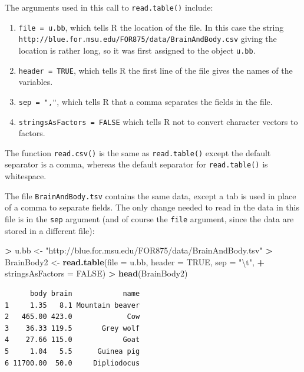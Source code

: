 \documentclass[]{krantz}
\makeatletter
\newenvironment{Shaded}{\begin{snugshade}}{\end{snugshade}}
\newcommand{\CharTok}[1]{\textcolor[rgb]{0.5,0.5,0.5}{#1}}
\newcommand{\DataTypeTok}[1]{\textcolor[rgb]{0.27,0.27,0.27}{#1}}
\newcommand{\KeywordTok}[1]{\textcolor[rgb]{0.27,0.27,0.27}{\textbf{#1}}}
\newcommand{\NormalTok}[1]{#1}
\newcommand{\OperatorTok}[1]{\textcolor[rgb]{0.43,0.43,0.43}{\textbf{#1}}}
\newcommand{\OtherTok}[1]{\textcolor[rgb]{0.37,0.37,0.37}{#1}}
\newcommand{\StringTok}[1]{\textcolor[rgb]{0.5,0.5,0.5}{#1}}
\providecommand{\tightlist}{%
  \setlength{\itemsep}{0pt}\setlength{\parskip}{0pt}}
\newenvironment{kframe}{%
\medskip{}
\setlength{\fboxsep}{.8em}
 \def\at@end@of@kframe{}%
 \ifinner\ifhmode%
  \def\at@end@of@kframe{\end{minipage}}%
  \begin{minipage}{\columnwidth}%
 \fi\fi%
 \def\FrameCommand##1{\hskip\@totalleftmargin \hskip-\fboxsep
 \colorbox{shadecolor}{##1}\hskip-\fboxsep
     \hskip-\linewidth \hskip-\@totalleftmargin \hskip\columnwidth}%
 \MakeFramed {\advance\hsize-\width
   \@totalleftmargin\z@ \linewidth\hsize
   \@setminipage}}%
 {\par\unskip\endMakeFramed%
 \at@end@of@kframe}
\renewenvironment{Shaded}{\begin{kframe}}{\end{kframe}}
\makeatother
\begin{document}
The arguments used in this call to \texttt{read.table()} include:

\begin{enumerate}
\def\labelenumi{\arabic{enumi}.}
\tightlist
\item
  \texttt{file\ =\ u.bb}, which tells R the location of the file. In this case the string \texttt{http://blue.for.msu.edu/FOR875/data/BrainAndBody.csv} giving the location is rather long, so it was first assigned to the object \texttt{u.bb}.
\item
  \texttt{header\ =\ TRUE}, which tells R the first line of the file gives the names of the variables.
\item
  \texttt{sep\ =\ ","}, which tells R that a comma separates the fields in the file.
\item
  \texttt{stringsAsFactors\ =\ FALSE} which tells R not to convert character vectors to factors.
\end{enumerate}

The function \texttt{read.csv()} is the same as \texttt{read.table()} except the default separator is a comma, whereas the default separator for \texttt{read.table()} is whitespace.

The file \texttt{BrainAndBody.tsv} contains the same data, except a tab is used in place of a comma to separate fields. The only change needed to read in the data in this file is in the \texttt{sep} argument (and of course the \texttt{file} argument, since the data are stored in a different file):

\begin{Shaded}
\begin{Highlighting}[]
\OperatorTok{>}\StringTok{ }\NormalTok{u.bb <-}\StringTok{ "http://blue.for.msu.edu/FOR875/data/BrainAndBody.tsv"}
\OperatorTok{>}\StringTok{ }\NormalTok{BrainBody2 <-}\StringTok{ }\KeywordTok{read.table}\NormalTok{(}\DataTypeTok{file =}\NormalTok{ u.bb, }\DataTypeTok{header =} \OtherTok{TRUE}\NormalTok{, }\DataTypeTok{sep =} \StringTok{"}\CharTok{\textbackslash{}t}\StringTok{"}\NormalTok{, }
\OperatorTok{+}\StringTok{                          }\DataTypeTok{stringsAsFactors =} \OtherTok{FALSE}\NormalTok{)}
\OperatorTok{>}\StringTok{ }\KeywordTok{head}\NormalTok{(BrainBody2)}
\end{Highlighting}
\end{Shaded}

\begin{verbatim}
      body brain            name
1     1.35   8.1 Mountain beaver
2   465.00 423.0             Cow
3    36.33 119.5       Grey wolf
4    27.66 115.0            Goat
5     1.04   5.5      Guinea pig
6 11700.00  50.0     Dipliodocus
\end{verbatim}
\end{document}
